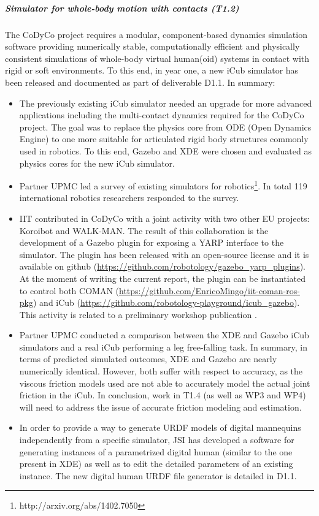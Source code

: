 \documentclass[12pt,a4paper,twoside]{article}
\begin{document}
\subparagraph{Simulator for whole-body motion with contacts (T1.2)}

The CoDyCo project requires a modular, component-based dynamics simulation software providing numerically stable, computationally efficient and physically consistent simulations of whole-body virtual human(oid) systems in contact with rigid or soft environments. To this end, in year one, a new iCub simulator has been released and documented as part of deliverable D1.1. In summary: 

\begin{itemize}
\item The previously existing iCub simulator needed an upgrade for more advanced applications including the multi-contact dynamics required for the CoDyCo project. The goal was to replace the physics core from ODE (Open Dynamics Engine) to one more suitable for articulated rigid body structures commonly used in robotics. To this end, Gazebo and XDE were chosen and evaluated as physics cores for the new iCub simulator. 

\item Partner UPMC led a survey of existing simulators for robotics\footnote{http://arxiv.org/abs/1402.7050}. In total 119 international robotics researchers responded to the survey.  

\item IIT contributed in CoDyCo with a joint activity with two other EU projects: Koroibot and WALK-MAN. The result of this collaboration is the development of a Gazebo plugin for exposing a YARP interface to the simulator. The plugin has been released with an open-source license and it is available on github (\url{https://github.com/robotology/gazebo_yarp_plugins}). At the moment of writing the current report, the plugin can be instantiated to control both COMAN (\url{https://github.com/EnricoMingo/iit-coman-ros-pkg}) and iCub (\url{https://github.com/robotology-playground/icub_gazebo}). This activity is related to a preliminary workshop publication \cite{Mingo2014}. 

\item Partner UPMC conducted a comparison between the XDE and Gazebo iCub simulators and a real iCub performing a leg free-falling task. In summary, in terms of predicted simulated outcomes, XDE and Gazebo are nearly numerically identical. However, both suffer with respect to accuracy, as the viscous friction models used are not able to accurately model the actual joint friction in the iCub. In conclusion, work in T1.4 (as well as WP3 and WP4) will need to address the issue of accurate friction modeling and estimation.

\item In order to provide a way to generate URDF models of digital mannequins independently from a specific simulator, JSI has developed a software for generating instances of a parametrized digital human (similar to the one present in XDE) as well as to edit the detailed parameters of an existing instance.  The new digital human URDF file generator is detailed in D1.1.
\end{itemize}
\end{document}
